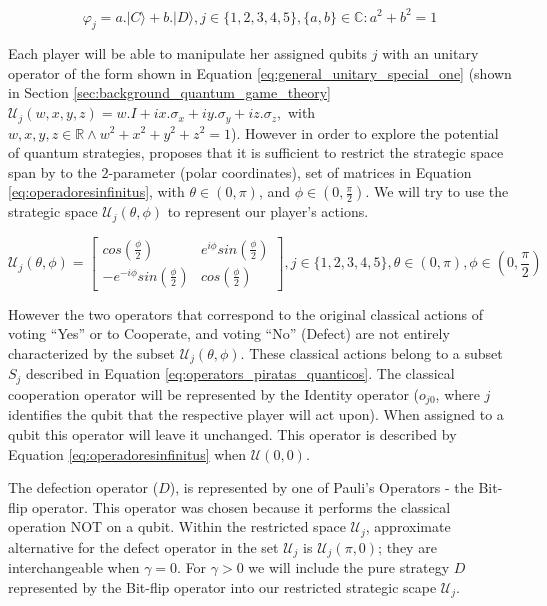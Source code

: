 \begin{equation}
\varphi_{j} = a . \vert C \rangle + b . \vert D \rangle , j \in \{ 1, 2, 3, 4, 5 \}, \{ a,b \} \in \mathbb{C} : a^2 + b^2 =1
\label{eq:opvarphiquantumstates}
\end{equation}

Each player will be able to manipulate her assigned qubits $j$ with an unitary operator of the form shown in Equation \ref{eq:general_unitary_special_one} (shown in Section \ref{sec:background_quantum_game_theory} $\mathcal{U}_{j}(w,x,y,z)=w.I + ix.\sigma_{x} + iy.\sigma_{y} + iz.\sigma_{z}, $ with $ w,x,y,z \in \mathbb{R} \wedge  
w^2 + x^2 + y^2 + z^2 =1 $). However in  order to explore the potential of quantum strategies, \cite{Eisert2008} proposes that it is sufficient to restrict the strategic space span by to the $2$-parameter (polar coordinates), set of matrices in Equation \ref{eq:operadoresinfinitus}, with $ \theta \in ( 0, \pi )$, and $\phi \in ( 0, \frac{\pi}{2})$. We will try to use the strategic space $\mathcal{U}_{j}(\theta,\phi)$ to represent our player's actions.



\begin{equation}
\mathcal{U}_{j}(\theta,\phi) = \left[\begin{array}{cc}
cos(\frac{\phi}{2}) & e^{i\phi}sin(\frac{\phi}{2})\\
-e^{-i\phi}sin(\frac{\phi}{2}) & cos(\frac{\phi}{2})
\end{array}\right] , j \in \{ 1, 2, 3, 4, 5 \}, \theta \in ( 0, \pi ) , \phi \in ( 0, \frac{\pi}{2})
\label{eq:operadoresinfinitus}
\end{equation}


 However the two operators that correspond to the original classical actions of voting ``Yes'' or to Cooperate, and voting ``No'' (Defect) are not entirely characterized by the subset $\mathcal{U}_{j}(\theta, \phi)$. These classical actions belong to a subset $S_{j}$ described in Equation \ref{eq:operators_piratas_quanticos}.  
The classical cooperation operator will be represented by the Identity operator ($o_{j0}$, where $j$ identifies the qubit that the respective player will act upon). When assigned to a qubit this operator will leave it unchanged. This operator is described by Equation \ref{eq:operadoresinfinitus} when $\mathcal{U}(0,0)$.

The defection operator ($D$), is represented by one of Pauli's Operators - the Bit-flip operator. This operator was chosen because it performs the classical operation NOT on a qubit. 
Within the restricted space $\mathcal{U}_{j}$, approximate alternative for the defect operator in the set $\mathcal{U}_{j}$ is $\mathcal{U}_{j}(\pi, 0)$; they are interchangeable when $\gamma = 0$. For $\gamma >0$ we will include the pure strategy $D$ represented by the Bit-flip operator into our restricted strategic scape $\mathcal{U}_{j}$.



